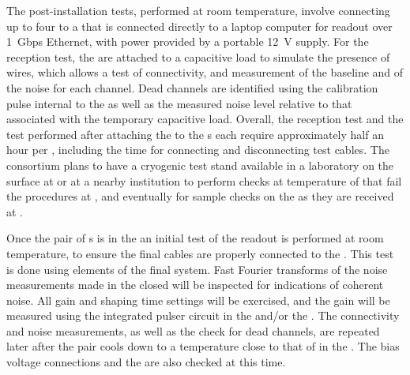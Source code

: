 The post-installation  tests, %
performed at room temperature,  %
involve connecting up to four  to a  that is 
connected directly to a laptop computer for readout over 1~Gbps
Ethernet, with power provided by a portable 12~V supply. For 
the reception test, the  are attached to a capacitive 
load to simulate the presence of wires, which allows a test of connectivity, %
and measurement of the baseline and \rms of the noise for 
each channel. Dead channels are identified using the calibration  pulse internal to the   as well as the measured
noise level relative to that associated with the temporary capacitive load.
Overall, the reception test and the test performed after attaching the
 to the s each require approximately half an hour per , %
including  the time for connecting and disconnecting test cables.
The  consortium plans to have a cryogenic test stand available
in a laboratory on the surface at  or at a nearby institution to perform checks at \lntwo temperature
of  that fail the  procedures at ,
and eventually for sample checks on the  as they are received
at .

Once the pair of s is in the \coldbox an initial test of the readout is performed at room temperature, to ensure the final cables are
properly connected to the . This test is done using elements of the final  system.
Fast Fourier transforms of
the noise measurements made in the closed \coldbox will be inspected for indications
of coherent noise. All  gain and shaping time settings will be exercised,
and the gain will be measured using the integrated pulser circuit in the 
 and/or the . The connectivity and noise measurements, as well
as the check for dead channels, are repeated later after the  pair cools
down to a temperature close to that of \lntwo in the \coldbox. The bias voltage
connections and the  are also checked at this time.

